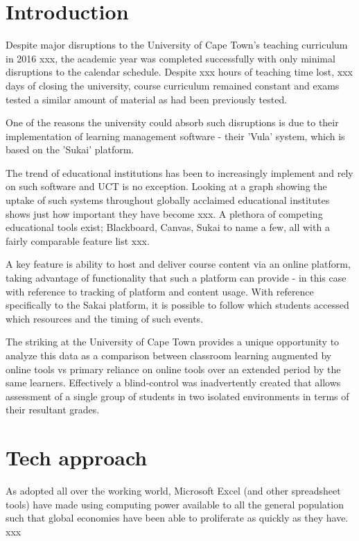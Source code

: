 \section{Introduction}
Despite major disruptions to the University of Cape Town's teaching curriculum in 2016 xxx, the academic year was completed successfully with only minimal disruptions to the calendar schedule. Despite xxx hours of teaching time lost, xxx days of closing the university, course curriculum remained constant and exams tested a similar amount of material as had been previously tested.

One of the reasons the university could absorb such disruptions is due to their implementation of learning management software - their 'Vula' system, which is based on the 'Sukai' platform.

The trend of educational institutions has been to increasingly implement and rely on such software and UCT is no exception. Looking at a graph showing the uptake of such systems throughout globally acclaimed educational institutes shows just how important they have become xxx. A plethora of competing educational tools exist; Blackboard, Canvas, Sukai to name a few, all with a fairly comparable feature list xxx.

A key feature is ability to host and deliver course content via an online platform, taking advantage of functionality that such a platform can provide - in this case with reference to tracking of platform and content usage. With reference specifically to the Sakai platform, it is possible to follow which students accessed which resources and the timing of such events.

The striking at the University of Cape Town provides a unique opportunity to analyze this data as a comparison between classroom learning augmented by online tools vs primary reliance on online tools over an extended period by the same learners. Effectively a blind-control was inadvertently created that allows assessment of a single group of students in two isolated environments in terms of their resultant grades.

\section{Tech approach}
As adopted all over the working world, Microsoft Excel (and other spreadsheet tools) have made using computing power available to all the general population such that global economies have been able to proliferate as quickly as they have. xxx

